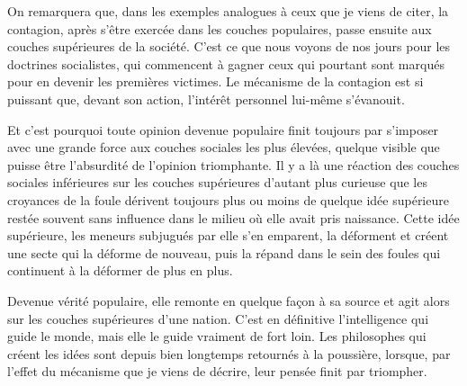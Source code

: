 \documentclass[french,twoside]{book} %
\begin{document}
On remarquera que, dans les exemples analogues à ceux que je viens de citer, la contagion, après s’être exercée dans les couches populaires, passe ensuite aux couches supérieures de la société. C’est ce que nous voyons de nos jours pour les doctrines socialistes, qui commencent à gagner ceux qui pourtant sont marqués pour en devenir les premières victimes. Le mécanisme de la contagion est si puissant que, devant son action, l’intérêt personnel lui-même s’évanouit.\par
Et c’est pourquoi toute opinion devenue populaire finit toujours par s’imposer avec une grande force aux couches sociales les plus élevées, quelque visible que puisse être l’absurdité de l’opinion triomphante. Il y a là une réaction des couches sociales inférieures sur les couches supérieures d’autant plus curieuse que les croyances de la foule dérivent toujours plus ou moins de quelque idée supérieure restée souvent sans influence dans le milieu où elle avait pris naissance. Cette idée supérieure, les me­neurs subjugués par elle s’en emparent, la déforment et créent une secte qui la déforme de nouveau, puis la répand dans le sein des foules qui continuent à la défor­mer de plus en plus.\par
Devenue vérité populaire, elle remonte en quelque façon à sa source et agit alors sur les couches supérieures d’une nation. C’est en définitive l’intelligence qui guide le monde, mais elle le guide vraiment de fort loin. Les philosophes qui créent les idées sont depuis bien longtemps retournés à la poussière, lorsque, par l’effet du mécanisme que je viens de décrire, leur pensée finit par triompher.
\end{document}
